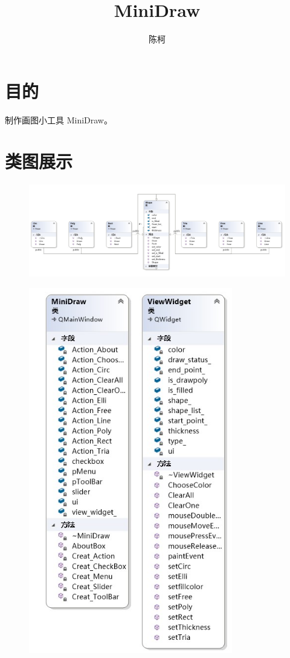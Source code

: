 \documentclass{article}
\title{MiniDraw}
\author{陈柯}
\begin{document}
	\maketitle
	
	\section{目的}
	
	制作画图小工具 MiniDraw。
	\section{类图展示}
	\begin{figure}[htb]
		\begin{center}
		\includegraphics[width=7in]{class1.jpg}
		\end{center}
	\end{figure}
	\clearpage
	\begin{figure}[htb]
		\begin{center}
			\includegraphics[width=3.5in]{class2.jpg}
		\end{center}
	\end{figure}
\end{document}
